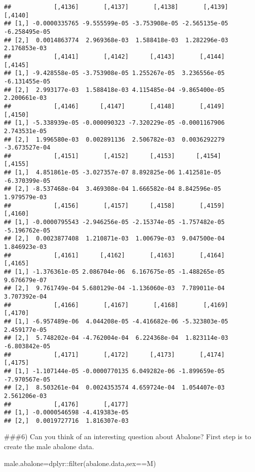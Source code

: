 \documentclass[
]{article}
\newenvironment{Shaded}{\begin{snugshade}}{\end{snugshade}}
\newcommand{\FunctionTok}[1]{\textcolor[rgb]{0.00,0.00,0.00}{#1}}
\newcommand{\NormalTok}[1]{#1}
\newcommand{\OtherTok}[1]{\textcolor[rgb]{0.56,0.35,0.01}{#1}}
\newcommand{\SpecialCharTok}[1]{\textcolor[rgb]{0.00,0.00,0.00}{#1}}
\newcommand{\StringTok}[1]{\textcolor[rgb]{0.31,0.60,0.02}{#1}}
\begin{document}
\begin{verbatim}
##            [,4136]       [,4137]       [,4138]       [,4139]       [,4140]
## [1,] -0.0000335765 -9.555599e-05 -3.753908e-05 -2.565135e-05 -6.258495e-05
## [2,]  0.0014863774  2.969368e-03  1.588418e-03  1.282296e-03  2.176853e-03
##            [,4141]       [,4142]      [,4143]       [,4144]       [,4145]
## [1,] -9.428558e-05 -3.753908e-05 1.255267e-05  3.236556e-05 -6.131455e-05
## [2,]  2.993177e-03  1.588418e-03 4.115485e-04 -9.865400e-05  2.200661e-03
##            [,4146]      [,4147]       [,4148]       [,4149]       [,4150]
## [1,] -5.338939e-05 -0.000090323 -7.320229e-05 -0.0001167906  2.743531e-05
## [2,]  1.996580e-03  0.002891136  2.506782e-03  0.0036292279 -3.673527e-04
##            [,4151]       [,4152]      [,4153]      [,4154]       [,4155]
## [1,]  4.851861e-05 -3.027357e-07 8.892825e-06 1.412581e-05 -6.370399e-05
## [2,] -8.537468e-04  3.469308e-04 1.666582e-04 8.842596e-05  1.979579e-03
##            [,4156]       [,4157]      [,4158]       [,4159]       [,4160]
## [1,] -0.0000795543 -2.946256e-05 -2.15374e-05 -1.757482e-05 -5.196762e-05
## [2,]  0.0023877408  1.210871e-03  1.00679e-03  9.047500e-04  1.846923e-03
##            [,4161]      [,4162]       [,4163]       [,4164]      [,4165]
## [1,] -1.376361e-05 2.086704e-06  6.167675e-05 -1.488265e-05 9.676679e-07
## [2,]  9.761749e-04 5.680129e-04 -1.136060e-03  7.789011e-04 3.707392e-04
##            [,4166]       [,4167]       [,4168]       [,4169]       [,4170]
## [1,] -6.957489e-06  4.044208e-05 -4.416682e-06 -5.323803e-05  2.459177e-05
## [2,]  5.748202e-04 -4.762004e-04  6.224368e-04  1.823114e-03 -6.803842e-05
##            [,4171]       [,4172]      [,4173]       [,4174]       [,4175]
## [1,] -1.107144e-05 -0.0000770135 6.049282e-06 -1.899659e-05 -7.970567e-05
## [2,]  8.503261e-04  0.0024353574 4.659724e-04  1.054407e-03  2.561206e-03
##            [,4176]       [,4177]
## [1,] -0.0000546598 -4.419383e-05
## [2,]  0.0019727716  1.816307e-03
\end{verbatim}

\#\#\#6) Can you think of an interesting question about Abalone? First
step is to create the male abalone data.

\begin{Shaded}
\begin{Highlighting}[]
\NormalTok{male.abalone}\OtherTok{=}\NormalTok{dplyr}\SpecialCharTok{::}\FunctionTok{filter}\NormalTok{(abalone.data,sex}\SpecialCharTok{==}\StringTok{\textquotesingle{}M\textquotesingle{}}\NormalTok{)}
\end{Highlighting}
\end{Shaded}
\end{document}
